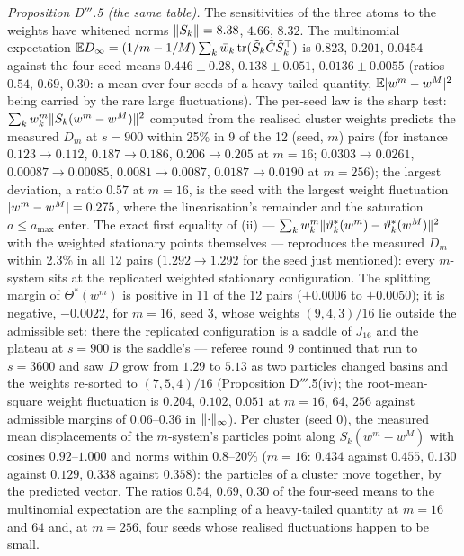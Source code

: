 \smallskip
\noindent\emph{Proposition D$'''$.5 (the same table).} The sensitivities of the three atoms to the weights have
whitened norms $\lVert S_k\rVert = 8.38$, $4.66$, $8.32$. The multinomial expectation
$\mathbb{E} D_\infty = (1/m - 1/M)\sum_k\bar w_k\operatorname{tr}(\tilde S_k\tilde C\tilde S_k^\top)$ is $0.823$, $0.201$, $0.0454$ against
the four-seed means $0.446\pm0.28$, $0.138\pm0.051$, $0.0136\pm0.0055$ (ratios $0.54$, $0.69$, $0.30$: a mean over
four seeds of a heavy-tailed quantity, $\mathbb{E}\lvert w^m - w^M\rvert^2$ being carried by the rare large fluctuations). The
per-seed law is the sharp test: $\sum_kw^m_k\lVert \tilde S_k(w^m - w^M)\rVert^2$ computed from the realised cluster
weights predicts the measured $D_m$ at $s = 900$ within 25\% in 9 of the 12 (seed, $m$) pairs (for instance
$0.123\to0.112$, $0.187\to0.186$, $0.206\to0.205$ at $m = 16$; $0.0303\to0.0261$, $0.00087\to0.00085$,
$0.0081\to0.0087$, $0.0187\to0.0190$ at $m = 256$); the largest deviation, a ratio $0.57$ at $m = 16$, is the seed
with the largest weight fluctuation $\lvert w^m - w^M\rvert = 0.275$, where the linearisation's remainder and the saturation
$a\le a_{\max}$ enter. The exact first equality of (ii) --- $\sum_kw^m_k\lVert \vartheta^*_k(w^m) - \vartheta^*_k(w^M)\rVert^2$
with the weighted stationary points themselves --- reproduces the measured $D_m$ within 2.3\% in all 12 pairs
($1.292\to1.292$ for the seed just mentioned): every $m$-system sits at the replicated weighted stationary
configuration. The splitting margin of $\Theta^*(w^m)$ is positive in 11 of the 12 pairs ($+0.0006$ to $+0.0050$);
it is negative, $-0.0022$, for $m = 16$, seed 3, whose weights $(9,4,3)/16$ lie outside the admissible set: there
the replicated configuration is a saddle of $J_{16}$ and the plateau at $s = 900$ is the saddle's --- referee round 9
continued that run to $s = 3600$ and saw $D$ grow from $1.29$ to $5.13$ as two particles changed basins and the
weights re-sorted to $(7,5,4)/16$ (Proposition D$'''$.5(iv); the root-mean-square weight fluctuation is $0.204$,
$0.102$, $0.051$ at $m = 16$, $64$, $256$ against admissible margins of $0.06$--$0.36$ in $\lVert \cdot\rVert_\infty$). Per
cluster (seed 0), the measured mean displacements of the $m$-system's particles point along $S_k(w^m - w^M)$ with
cosines $0.92$--$1.000$ and norms within 0.8--20\% ($m = 16$: $0.434$ against $0.455$, $0.130$ against $0.129$,
$0.338$ against $0.358$): the particles of a cluster move together, by the predicted vector. The ratios $0.54$,
$0.69$, $0.30$ of the four-seed means to the multinomial expectation are the sampling of a heavy-tailed quantity at
$m = 16$ and $64$ and, at $m = 256$, four seeds whose realised fluctuations happen to be small.

